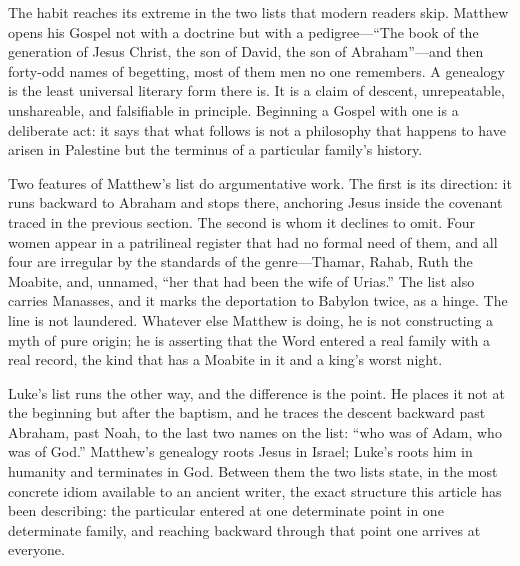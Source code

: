 The habit reaches its extreme in the two lists that modern readers skip. Matthew opens his Gospel not with a doctrine but with a pedigree---``The book of the generation of Jesus Christ, the son of David, the son of Abraham''---and then forty-odd names of begetting, most of them men no one remembers. A genealogy is the least universal literary form there is. It is a claim of descent, unrepeatable, unshareable, and falsifiable in principle. Beginning a Gospel with one is a deliberate act: it says that what follows is not a philosophy that happens to have arisen in Palestine but the terminus of a particular family's history.

Two features of Matthew's list do argumentative work. The first is its direction: it runs backward to Abraham and stops there, anchoring Jesus inside the covenant traced in the previous section. The second is whom it declines to omit. Four women appear in a patrilineal register that had no formal need of them, and all four are irregular by the standards of the genre---Thamar, Rahab, Ruth the Moabite, and, unnamed, ``her that had been the wife of Urias.'' The list also carries Manasses, and it marks the deportation to Babylon twice, as a hinge. The line is not laundered. Whatever else Matthew is doing, he is not constructing a myth of pure origin; he is asserting that the Word entered a real family with a real record, the kind that has a Moabite in it and a king's worst night.

Luke's list runs the other way, and the difference is the point. He places it not at the beginning but after the baptism, and he traces the descent backward past Abraham, past Noah, to the last two names on the list: ``who was of Adam, who was of God.'' Matthew's genealogy roots Jesus in Israel; Luke's roots him in humanity and terminates in God. Between them the two lists state, in the most concrete idiom available to an ancient writer, the exact structure this article has been describing: the particular entered at one determinate point in one determinate family, and reaching backward through that point one arrives at everyone.

